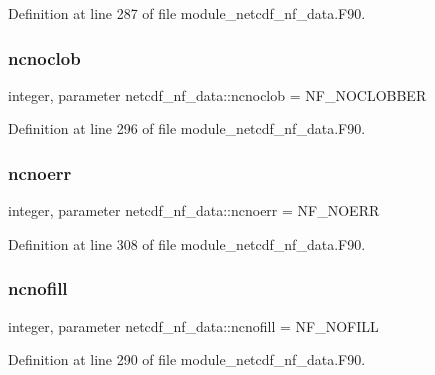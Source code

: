 Definition at line 287 of file module\+\_\+netcdf\+\_\+nf\+\_\+data.\+F90.

\mbox{\label{namespacenetcdf__nf__data_af61770c9009f96909807d8a86849a191}} 
\subsubsection{\texorpdfstring{ncnoclob}{ncnoclob}}
{\footnotesize\ttfamily integer, parameter netcdf\+\_\+nf\+\_\+data\+::ncnoclob = N\+F\+\_\+\+N\+O\+C\+L\+O\+B\+B\+ER}



Definition at line 296 of file module\+\_\+netcdf\+\_\+nf\+\_\+data.\+F90.

\mbox{\label{namespacenetcdf__nf__data_a565c69bf6a7a8cf5736e86c239373273}} 
\subsubsection{\texorpdfstring{ncnoerr}{ncnoerr}}
{\footnotesize\ttfamily integer, parameter netcdf\+\_\+nf\+\_\+data\+::ncnoerr = N\+F\+\_\+\+N\+O\+E\+RR}



Definition at line 308 of file module\+\_\+netcdf\+\_\+nf\+\_\+data.\+F90.

\mbox{\label{namespacenetcdf__nf__data_ac041023d4eb6ad4fbfc17d19791c34b0}} 
\subsubsection{\texorpdfstring{ncnofill}{ncnofill}}
{\footnotesize\ttfamily integer, parameter netcdf\+\_\+nf\+\_\+data\+::ncnofill = N\+F\+\_\+\+N\+O\+F\+I\+LL}



Definition at line 290 of file module\+\_\+netcdf\+\_\+nf\+\_\+data.\+F90.

